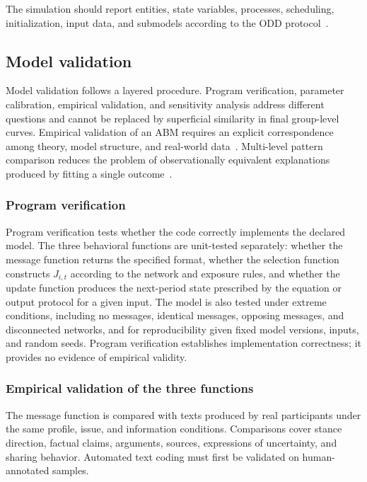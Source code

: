 \documentclass[11pt,a4paper]{article}
\begin{document}
The simulation should report entities, state variables, processes, scheduling, initialization, input data, and submodels according to the ODD protocol~\citep{grimm2020}.

\subsection{Model validation}

Model validation follows a layered procedure. Program verification, parameter calibration, empirical validation, and sensitivity analysis address different questions and cannot be replaced by superficial similarity in final group-level curves. Empirical validation of an ABM requires an explicit correspondence among theory, model structure, and real-world data~\citep{windrum2007}. Multi-level pattern comparison reduces the problem of observationally equivalent explanations produced by fitting a single outcome~\citep{grimm2005}.

\subsubsection{Program verification}

Program verification tests whether the code correctly implements the declared model. The three behavioral functions are unit-tested separately: whether the message function returns the specified format, whether the selection function constructs $J_{i,t}$ according to the network and exposure rules, and whether the update function produces the next-period state prescribed by the equation or output protocol for a given input. The model is also tested under extreme conditions, including no messages, identical messages, opposing messages, and disconnected networks, and for reproducibility given fixed model versions, inputs, and random seeds. Program verification establishes implementation correctness; it provides no evidence of empirical validity.

\subsubsection{Empirical validation of the three functions}

The message function is compared with texts produced by real participants under the same profile, issue, and information conditions. Comparisons cover stance direction, factual claims, arguments, sources, expressions of uncertainty, and sharing behavior. Automated text coding must first be validated on human-annotated samples.
\end{document}
